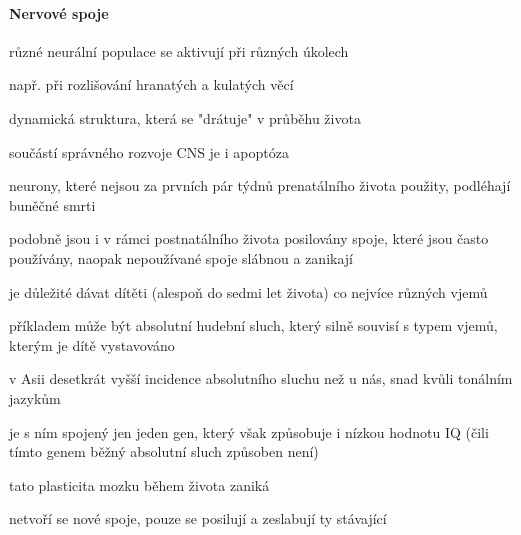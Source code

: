 \documentclass[DIV=8]{scrreprt}
\begin{document}
\paragraph{Nervové spoje}
\begin{myItemize}[nosep]
    \item různé neurální populace se aktivují při různých úkolech
\begin{myItemize}[nosep]
    \item např. při rozlišování hranatých a kulatých věcí
\end{myItemize}

    \item dynamická struktura, která se "drátuje" v průběhu života
    \item součástí správného rozvoje CNS je i apoptóza
\begin{myItemize}[nosep]
    \item neurony, které nejsou za prvních pár týdnů prenatálního života použity, podléhají buněčné smrti
\end{myItemize}

    \item podobně jsou i v rámci postnatálního života posilovány spoje, které jsou často používány, naopak nepoužívané spoje slábnou a zanikají
\begin{myItemize}[nosep]
    \item je důležité dávat dítěti (alespoň do sedmi let života) co nejvíce různých vjemů
    \item příkladem může být absolutní hudební sluch, který silně souvisí s typem vjemů, kterým je dítě vystavováno
\begin{myItemize}[nosep]
    \item v Asii desetkrát vyšší incidence absolutního sluchu než u nás, snad kvůli tonálním jazykům
    \item je s ním spojený jen jeden gen, který však způsobuje i nízkou hodnotu IQ (čili tímto genem běžný absolutní sluch způsoben není)
\end{myItemize}

\end{myItemize}

    \item tato plasticita mozku během života zaniká
\begin{myItemize}[nosep]
    \item netvoří se nové spoje, pouze se posilují a zeslabují ty stávající
\end{myItemize}

\end{myItemize}
\end{document}
